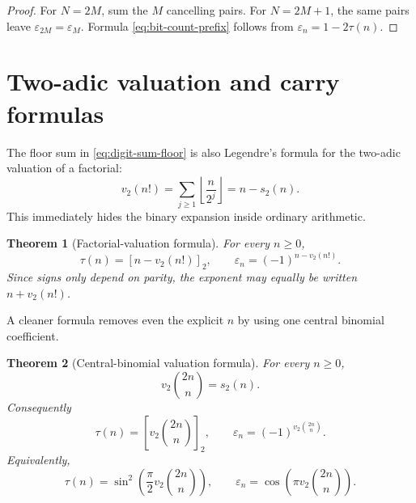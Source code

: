 \documentclass[11pt,oneside]{article}
\newtheorem{theorem}{Theorem}[section]
\theoremstyle{definition}
\theoremstyle{remark}
\newcommand{\vtwo}{v_2}
\newcommand{\bitsum}{s_2}
\newcommand{\eps}{\varepsilon}
\newcommand{\floor}[1]{\left\lfloor #1\right\rfloor}
\newcommand{\res}[2]{\left[#1\right]_{#2}}
\begin{document}
\begin{proof}
For \(N=2M\), sum the \(M\) cancelling pairs.  For \(N=2M+1\), the same
pairs leave \(\eps_{2M}=\eps_M\).  Formula \eqref{eq:bit-count-prefix} follows
from \(\eps_n=1-2\tau(n)\).
\end{proof}

\section{Two-adic valuation and carry formulas}
\label{sec:valuations}

The floor sum in \eqref{eq:digit-sum-floor} is also Legendre's formula for
the two-adic valuation of a factorial:
\begin{equation}
  \vtwo(n!)=\sum_{j\ge1}\floor{\frac{n}{2^j}}
           =n-\bitsum(n).
  \label{eq:legendre-two}
\end{equation}
This immediately hides the binary expansion inside ordinary arithmetic.

\begin{theorem}[Factorial-valuation formula]
For every \(n\ge0\),
\begin{equation}
  \tau(n)=\res{n-\vtwo(n!)}{2},
  \qquad
  \eps_n=(-1)^{n-\vtwo(n!)}.
  \label{eq:factorial-valuation-formula}
\end{equation}
Since signs only depend on parity, the exponent may equally be written
\(n+\vtwo(n!)\).
\end{theorem}

A cleaner formula removes even the explicit \(n\) by using one central
binomial coefficient.

\begin{theorem}[Central-binomial valuation formula]
For every \(n\ge0\),
\begin{equation}
  \vtwo\!\binom{2n}{n}=\bitsum(n).
  \label{eq:central-binomial-valuation}
\end{equation}
Consequently
\begin{equation}
  \boxed{
  \tau(n)=\res{\vtwo\binom{2n}{n}}{2},
  \qquad
  \eps_n=(-1)^{\vtwo\binom{2n}{n}}.}
  \label{eq:central-binomial-thue-morse}
\end{equation}
Equivalently,
\begin{equation}
  \tau(n)=\sin^2\!\left(
       \frac{\pi}{2}\vtwo\!\binom{2n}{n}
     \right),
  \qquad
  \eps_n=\cos\!\left(
       \pi\vtwo\!\binom{2n}{n}
     \right).
  \label{eq:central-binomial-trig}
\end{equation}
\end{theorem}
\end{document}
